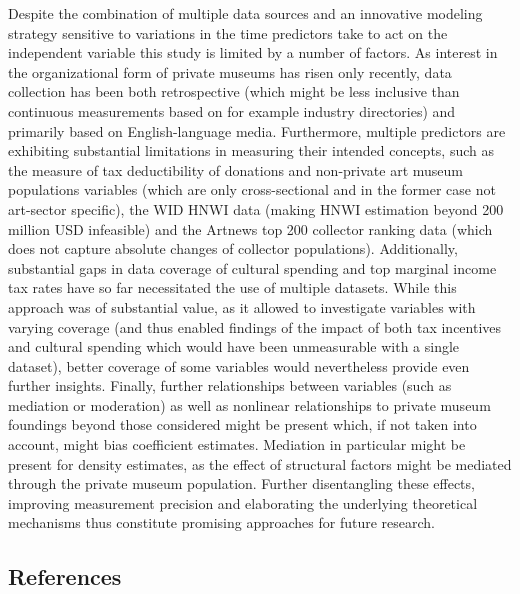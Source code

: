 \documentclass[11pt]{article}
\begin{document}
Despite the combination of multiple data sources and an innovative modeling strategy sensitive to variations in the time predictors take to act on the independent variable this study is limited by a number of factors. 
As interest in the organizational form of private museums has risen only recently, data collection has been both retrospective (which might be less inclusive than continuous measurements based on for example industry directories) and primarily based on English-language media.
Furthermore, multiple predictors are exhibiting substantial limitations in measuring their intended concepts, such as the measure of tax deductibility of donations and non-private art museum populations variables (which are only cross-sectional and in the former case not art-sector specific), the WID HNWI data (making HNWI estimation beyond 200 million USD infeasible) and the Artnews top 200 collector ranking data (which does not capture absolute changes of collector populations).
Additionally, substantial gaps in data coverage of cultural spending and top marginal income tax rates have so far necessitated the use of multiple datasets.
While this approach was of substantial value, as it allowed to investigate variables with varying coverage (and thus enabled findings of the impact of both tax incentives and cultural spending which would have been unmeasurable with a single dataset), better coverage of some variables would nevertheless provide even further insights.
Finally, further relationships between variables (such as mediation or moderation) as well as nonlinear relationships to private museum foundings beyond those considered might be present which, if not taken into account, might bias coefficient estimates.
Mediation in particular might be present for density estimates, as the effect of structural factors might be mediated through the private museum population.
Further disentangling these effects, improving measurement precision and elaborating the underlying theoretical mechanisms thus constitute promising approaches for future research. 



\subsection*{References}


\begin{sloppypar}
\printbibliography
\end{sloppypar}
\end{document}
